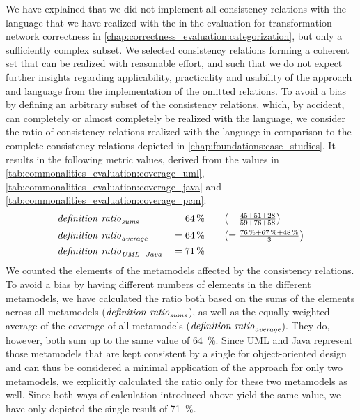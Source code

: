 We have explained that we did not implement all consistency relations with the \commonalities language that we have realized with the \reactionslanguage in the evaluation for transformation network correctness in \autoref{chap:correctness_evaluation:categorization}, but only a sufficiently complex subset.
We selected consistency relations forming a coherent set that can be realized with reasonable effort, and such that we do not expect further insights regarding applicability, practicality and usability of the \commonalities approach and language from the implementation of the omitted relations.
To avoid a bias by defining an arbitrary subset of the consistency relations, which, by accident, can completely or almost completely be realized with the \commonalities language, we consider the ratio of consistency relations realized with the \commonalities language in comparison to the complete consistency relations depicted in \autoref{chap:foundations:case_studies}.
It results in the following metric values, derived from the values in \autoref{tab:commonalities_evaluation:coverage_uml}, \autoref{tab:commonalities_evaluation:coverage_java} and \autoref{tab:commonalities_evaluation:coverage_pcm}:
\begin{alignat*}{3}
    &
	\mathit{definition\ ratio}_{\mathit{sums}} &&= \SI{64}{\percent} \quad  &&\bigl(= \tfrac{45 + 51 + 28}{59 + 76 + 58}\bigr)\\
	& 
	\mathit{definition\ ratio}_{\mathit{average}} &&= \SI{64}{\percent} \quad &&\bigl(= \tfrac{\SI{76}{\percent} + \SI{67}{\percent} + \SI{48}{\percent}}{3} \bigr) \\
	&
	\mathit{definition\ ratio}_{\mathit{UML-Java}} &&= \SI{71}{\percent}
\end{alignat*}
We counted the elements of the metamodels affected by the consistency relations.
To avoid a bias by having different numbers of elements in the different metamodels, we have calculated the ratio both based on the sums of the elements across all metamodels ($\mathvariable{definition\ ratio}_{\mathvariable{sums}}$), as well as the equally weighted average of the coverage of all metamodels ($\mathvariable{definition\ ratio}_{\mathvariable{average}}$).
They do, however, both sum up to the same value of \SI{64}{\percent}.
Since \gls{UML} and Java represent those metamodels that are kept consistent by a single \conceptmetamodel for object-oriented design and can thus be considered a minimal application of the \commonalities approach for only two metamodels, we explicitly  calculated the ratio only for these two metamodels as well.
Since both ways of calculation introduced above yield the same value, we have only depicted the single result of \SI{71}{\percent}.

